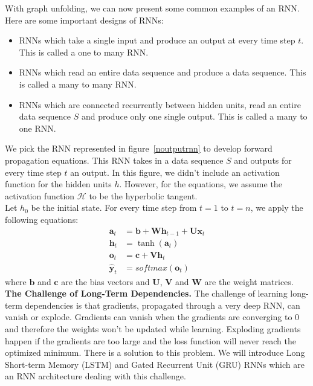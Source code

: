 
With graph unfolding, we can now present some common examples of an RNN. Here are
some important designs of RNNs:\\

\begin{itemize}
  \item RNNs which take a single input and produce an output at every time step
    $t$. This is called a one to many RNN.\\
  \item RNNs which read an entire data sequence and produce a data sequence.
    This is called a many to many RNN.\\
  \item RNNs which are connected recurrently between hidden units, read an
    entire data sequence $S$ and produce only one single output. This is called
    a many to one RNN.\\
\end{itemize}



We pick the RNN represented in figure~\ref{noutputrnn} to develop forward
propagation equations. This RNN takes in a data sequence $S$ and outputs for
every time step $t$ an output. In this figure, we didn't include an
activation function for the hidden units $h$. However, for the equations, we
assume the activation function $\mathcal{H}$ to be the hyperbolic tangent.\\

Let $h_{0}$ be the initial state. For every time step from $t = 1$ to $t =
n$, we apply the following equations:
\begin{align}
  \bm{a}_{t} & = \bm{b} + \bm{Wh}_{t-1} + \bm{Ux}_{t} \\
  \bm{h}_{t} & = \tanh(\bm{a}_{t}) \\
  \bm{o}_{t} & = \bm c + \bm{Vh}_{t} \\
  \bm{\hat y}_{t} & = softmax(\bm o_{t})
\end{align}
where $\bm b$ and $\bm c$ are the bias vectors and $\bm U$, $\bm V$ and $\bm W$ are
the weight matrices.\\


\textbf{The Challenge of Long-Term Dependencies.} The challenge of learning
long-term dependencies is that gradients, propagated through a very deep RNN,
can vanish or explode. Gradients can vanish when the gradients are converging to
$0$ and therefore the weights won't be updated while learning. Exploding
gradients happen if the gradients are too large and the loss function will never
reach the optimized minimum. There is a solution to this problem. We will
introduce Long Short-term Memory (LSTM) and Gated Recurrent Unit (GRU) RNNs
which are an RNN architecture dealing with this
challenge.\cite{doi:10.1162/neco.1997.9.8.1735}~\\

